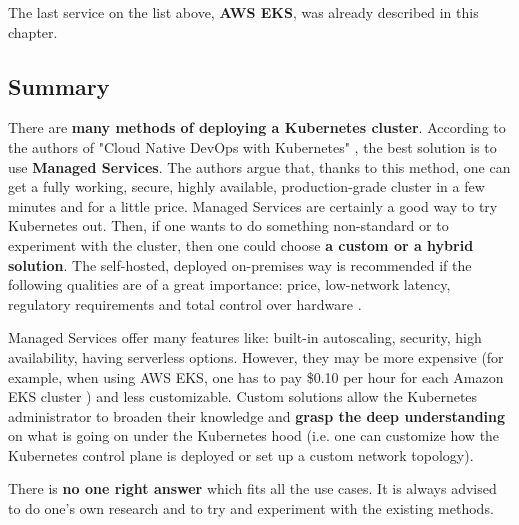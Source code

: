 The last service on the list above, \textbf{AWS EKS}, was already described in this chapter.

\subsection{Summary}

There are \textbf{many methods of deploying a Kubernetes cluster}. According to the authors of "Cloud Native DevOps with Kubernetes" \cite{book-cndwk}, the best solution is to use \textbf{Managed Services}. The authors argue that, thanks to this method, one can get a fully working, secure, highly available, production-grade cluster in a few minutes and for a little price. Managed Services are certainly a good way to try Kubernetes out. Then, if one wants to do something non-standard or to experiment with the cluster, then one could choose \textbf{a custom or a hybrid solution}. The self-hosted, deployed on-premises way is recommended if the following qualities are of a great importance: price, low-network latency, regulatory requirements and total control over hardware \cite{book-mastering-k8s}.

Managed Services offer many features like: built-in autoscaling, security, high availability, having serverless options. However, they may be more expensive (for example, when using AWS EKS, one has to pay \$0.10 per hour for each Amazon EKS cluster \cite{online-eks-pricing}) and less customizable. Custom solutions allow the Kubernetes administrator to broaden their knowledge and \textbf{grasp the deep understanding} on what is going on under the Kubernetes hood (i.e. one can customize how the Kubernetes control plane is deployed or set up a custom network topology).

There is \textbf{no one right answer} which fits all the use cases. It is always advised to do one's own research and to try and experiment with the existing methods.
